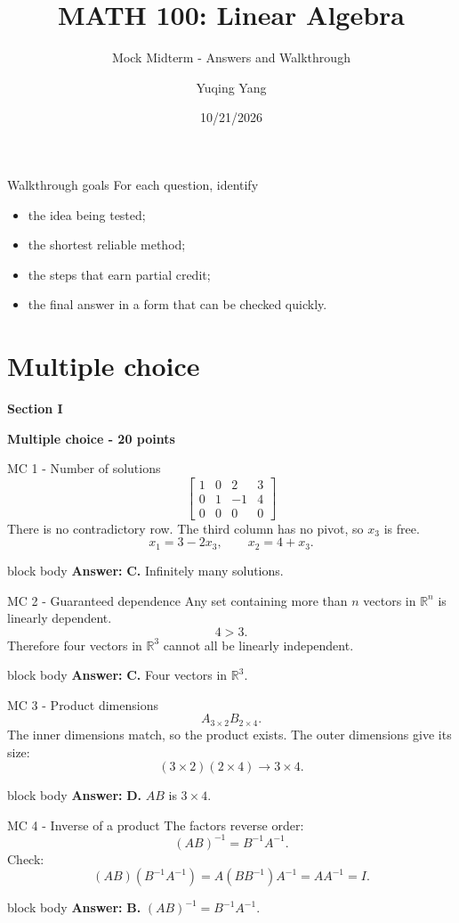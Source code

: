 \documentclass[aspectratio=169]{beamer}
\title{MATH 100: Linear Algebra}
\subtitle{Mock Midterm - Answers and Walkthrough}
\author{Yuqing Yang}
\institute{Macau University of Science and Technology}
\date{10/21/2026}
\newcommand{\R}{\mathbb{R}}
\newcommand{\sectioncard}[2]{%
  \begin{frame}[plain]
    \vfill\centering
    {\Huge\color{lectureorange}\bfseries #1}\par\bigskip
    {\LARGE\color{lecturegreen}\bfseries #2}
    \vfill
  \end{frame}}
\newcommand{\answerbox}[1]{%
  \begin{beamercolorbox}[sep=1.0ex,wd=\linewidth]{block body}
    \textbf{Answer:} #1
  \end{beamercolorbox}}
\begin{document}
\begin{frame}[plain]
  \titlepage
\end{frame}

\begin{frame}{Walkthrough goals}
For each question, identify
\begin{itemize}
  \item the idea being tested;
  \item the shortest reliable method;
  \item the steps that earn partial credit;
  \item the final answer in a form that can be checked quickly.
\end{itemize}
\end{frame}

\section{Multiple choice}
\sectioncard{Section I}{Multiple choice - 20 points}

\begin{frame}{MC 1 - Number of solutions}
\[
\left[\begin{array}{ccc|c}
1&0&2&3\\
0&1&-1&4\\
0&0&0&0
\end{array}\right]
\]
There is no contradictory row. The third column has no pivot, so $x_3$ is free.
\[
x_1=3-2x_3,
\qquad
x_2=4+x_3.
\]
\answerbox{\textbf{C.} Infinitely many solutions.}
\end{frame}

\begin{frame}{MC 2 - Guaranteed dependence}
Any set containing more than $n$ vectors in $\R^n$ is linearly dependent.
\[
4>3.
\]
Therefore four vectors in $\R^3$ cannot all be linearly independent.
\answerbox{\textbf{C.} Four vectors in $\R^3$.}
\end{frame}

\begin{frame}{MC 3 - Product dimensions}
\[
A_{3\times2}B_{2\times4}.
\]
The inner dimensions match, so the product exists. The outer dimensions give its size:
\[
(3\times2)(2\times4)\longrightarrow 3\times4.
\]
\answerbox{\textbf{D.} $AB$ is $3\times4$.}
\end{frame}

\begin{frame}{MC 4 - Inverse of a product}
The factors reverse order:
\[
(AB)^{-1}=B^{-1}A^{-1}.
\]
Check:
\[
(AB)(B^{-1}A^{-1})
=A(BB^{-1})A^{-1}
=AA^{-1}=I.
\]
\answerbox{\textbf{B.} $(AB)^{-1}=B^{-1}A^{-1}$.}
\end{frame}
\end{document}
